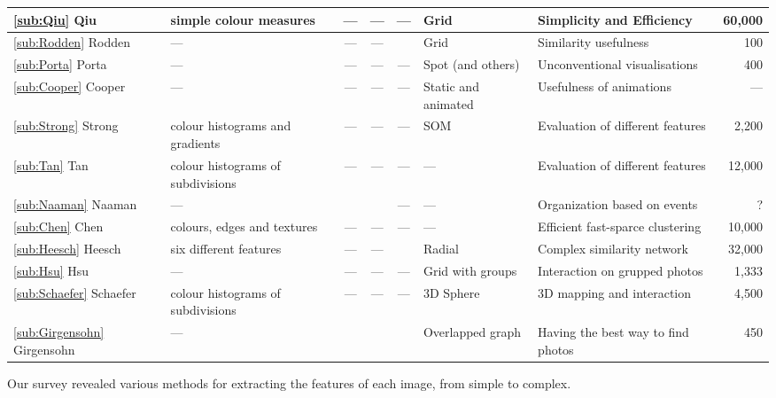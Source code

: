 \begin{table}[ht]
\begin{tabular}{|l|>{\centering}p{2.6cm}|c|c|c|>{\centering}p{2.1cm}|>{\centering}p{2.8cm}|r|}
\hline \ref{sub:Qiu}	Qiu \cite{Qiu:2007p1207}	& simple colour measures 			& --- & --- & --- & Grid 			   & Simplicity and Efficiency 			& 60,000	\\
\hline \ref{sub:Rodden} Rodden \cite{Rodden:2001p731}	& --- 								& --- & --- & \cm & Grid 			   & Similarity usefulness	 			& 	 100	\\
\hline \ref{sub:Porta} 	Porta \cite{Porta:2006p416}	& --- 								& --- & --- & --- & Spot (and others)  & Unconventional visualisations		& 	 400	\\
\hline \ref{sub:Cooper} Cooper \cite{Cooper:2006p543}	& --- 								& --- & --- & --- & Static and animated& Usefulness of animations 			& 	 ---	\\
\hline \ref{sub:Strong} Strong \cite{Strong:2009p413}	& colour histograms and gradients 	& --- & --- & --- & \ac{SOM} 		   & Evaluation of different features	&  2,200 	\\
\hline \ref{sub:Tan} 	Tan	\cite{Tan:2001p850}		& colour histograms of subdivisions & --- & --- & --- & --- 			   & Evaluation of different features 	& 12,000 	\\
\hline \ref{sub:Naaman} Naaman	\cite{Naaman:2004p1802}	& --- 								& \cm & \cm & --- & --- 			   & Organization based on events 		& 	   ?	\\
\hline \ref{sub:Chen} 	Chen	\cite{Chen:1998p2344}	& colours, edges and textures 		& --- & --- & --- & --- 			   & Efficient fast-sparce clustering 	& 10,000 	\\
\hline \ref{sub:Heesch} Heesch	\cite{Heesch:2004p2675} & six different features 			& --- & --- & \cm & Radial 			   & Complex similarity network 		& 32,000 	\\
\hline \ref{sub:Hsu}	Hsu	\cite{Hsu:2009p2696}	& --- 								& --- & --- & --- & Grid with groups   & Interaction on grupped photos 		&  1,333 	\\
\hline \ref{sub:Schaefer} Schaefer \cite{Schaefer:2010p1871} & colour histograms of subdivisions & --- & --- & --- & 3D Sphere		   & 3D mapping and interaction 		&  4,500 	\\
\hline \ref{sub:Girgensohn} Girgensohn \cite{Girgensohn:2010}	& --- 								& \cm & \cm & \cm & Overlapped graph   & Having the best way to find photos &    450	\\
\hline
 \end{tabular}
\label{tab:brows-meth}
\end{table}
Our survey revealed various methods for extracting the features of each image, from simple to complex.

